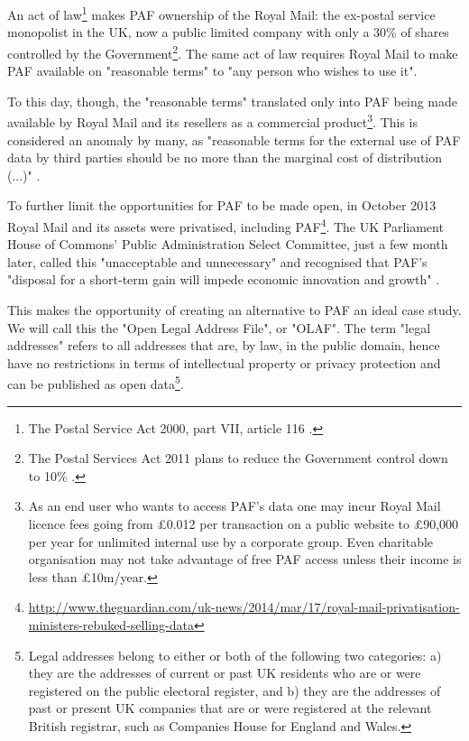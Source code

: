     An act of law\footnote{The Postal Service Act 2000, part VII, article 116 \cite{postalserviceact2000}.} makes PAF ownership of the Royal Mail: the ex-postal service monopolist in the UK, now a public limited company with only a 30\% of shares controlled by the Government\footnote{The Postal Services Act 2011 plans to reduce the Government control down to 10\% \cite{postalserviceact2011}.}. The same act of law requires Royal Mail to make PAF available on "reasonable terms" to "any person who wishes to use it".
    
    To this day, though, the "reasonable terms" translated only into PAF being made available by Royal Mail and its resellers as a commercial product\footnote{As an end user who wants to access PAF's data one may incur Royal Mail licence fees going from \pounds0.012 per transaction on a public website to \pounds90,000 per year for unlimited internal use by a corporate group. Even charitable organisation may not take advantage of free PAF access unless their income is less than \pounds10m/year.}. This is considered an anomaly by many, as "reasonable terms for the external use of PAF data by third parties should be no more than the marginal cost of distribution (...)" \cite{odugresponse}. 

    To further limit the opportunities for PAF to be made open, in October 2013 Royal Mail and its assets were privatised, including PAF\footnote{\url{http://www.theguardian.com/uk-news/2014/mar/17/royal-mail-privatisation-ministers-rebuked-selling-data}}. The UK Parliament House of Commons' Public Administration Select Committee, just a few month later, called this "unacceptable and unnecessary" and recognised that PAF's "disposal for a short-term gain will impede economic innovation and growth" \cite{pascod}.

    This makes the opportunity of creating an alternative to PAF an ideal case study. We will call this the "Open Legal Address File", or "OLAF". The term "legal addresses" refers to all addresses that are, by law, in the public domain, hence have no restrictions in terms of intellectual property or privacy protection and can be published as open data\footnote{Legal addresses belong to either or both of the following two categories: a) they are the addresses of current or past UK residents who are or were registered on the public electoral register, and b) they are the addresses of past or present UK companies that are or were registered at the relevant British registrar, such as Companies House for England and Wales.}.

